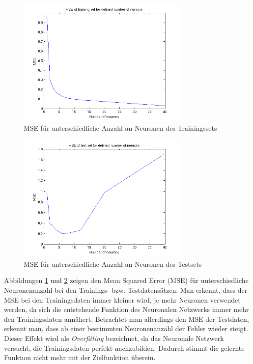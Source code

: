 \begin{figure}[h!]
  \centering
  \includegraphics[width=0.75\textwidth]{./figures/3/3_mse_train.png}
  \caption{MSE für unterschiedliche Anzahl an Neuronen des Trainingssets}
  \label{fig:3_mse_train}
\end{figure}

\begin{figure}[h!]
  \centering
  \includegraphics[width=0.75\textwidth]{./figures/3/3_mse_test.png}
  \caption{MSE für unterschiedliche Anzahl an Neuronen des Testsets}
  \label{fig:3_mse_test}
\end{figure}

Abbildungen \ref{fig:3_mse_train} und \ref{fig:3_mse_test} zeigen den Mean Squared Error (MSE) für unterschiedliche Neuronenanzahl bei den Trainings- bzw. Testdatensätzen. Man erkennt, dass der MSE bei den Trainingsdaten immer kleiner wird, je mehr Neuronen verwendet werden, da sich die entstehende Funktion des Neuronalen Netzwerks immer mehr den Trainingsdaten annähert. Betrachtet man allerdings den MSE der Testdaten, erkennt man, dass ab einer bestimmten Neuronenanzahl der Fehler wieder steigt. Dieser Effekt wird als \emph{Overfitting} bezeichnet, da das Neuronale Netzwerk versucht, die Trainingsdaten perfekt nachzubilden. Dadurch stimmt die gelernte Funktion nicht mehr mit der Zielfunktion überein.

